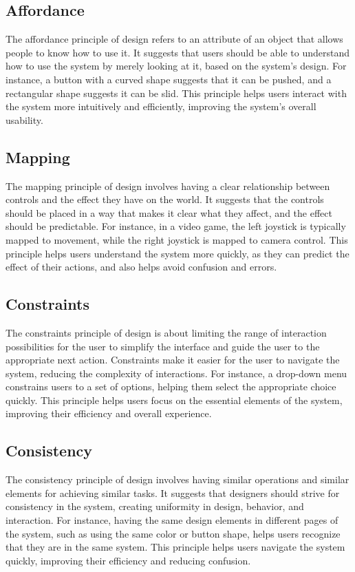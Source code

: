 \documentclass{article}
\begin{document}
\subsection{Affordance}
The affordance principle of design refers to an attribute of an object that allows people to know how to use it. It suggests that users should be able to understand how to use the system by merely looking at it, based on the system's design. For instance, a button with a curved shape suggests that it can be pushed, and a rectangular shape suggests it can be slid. This principle helps users interact with the system more intuitively and efficiently, improving the system's overall usability.
\subsection{Mapping}
The mapping principle of design involves having a clear relationship between controls and the effect they have on the world. It suggests that the controls should be placed in a way that makes it clear what they affect, and the effect should be predictable. For instance, in a video game, the left joystick is typically mapped to movement, while the right joystick is mapped to camera control. This principle helps users understand the system more quickly, as they can predict the effect of their actions, and also helps avoid confusion and errors.
\subsection{Constraints}
The constraints principle of design is about limiting the range of interaction possibilities for the user to simplify the interface and guide the user to the appropriate next action. Constraints make it easier for the user to navigate the system, reducing the complexity of interactions. For instance, a drop-down menu constrains users to a set of options, helping them select the appropriate choice quickly. This principle helps users focus on the essential elements of the system, improving their efficiency and overall experience.
\subsection{Consistency}
The consistency principle of design involves having similar operations and similar elements for achieving similar tasks. It suggests that designers should strive for consistency in the system, creating uniformity in design, behavior, and interaction. For instance, having the same design elements in different pages of the system, such as using the same color or button shape, helps users recognize that they are in the same system. This principle helps users navigate the system quickly, improving their efficiency and reducing confusion.
\end{document}
